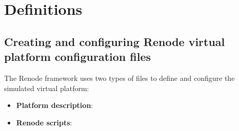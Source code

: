 \chapter{Definitions}
\section{Creating and configuring Renode virtual platform configuration files} \label{app:creating_renode_platforms}

The Renode framework uses two types of files to define and configure the simulated virtual platform:

\begin{itemize}
	\item \textbf{Platform description}:
	\item \textbf{Renode scripts}:
\end{itemize}
